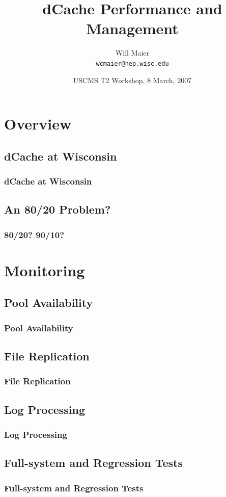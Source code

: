\documentclass{beamer}
\title{dCache Performance and Management}
\author[Will Maier]{Will Maier \\ \texttt{wcmaier@hep.wisc.edu}}
\institute[Wisconsin]{University of Wisconsin - High Energy Physics}
\date[8 March, 2007]{USCMS T2 Workshop, 8 March, 2007}
\begin{document}
\begin{frame}
    \titlepage
\end{frame}

\section{Overview}
\begin{frame}
    \tableofcontents
\end{frame}

\subsection{dCache at Wisconsin}
\begin{frame}
\frametitle{dCache at Wisconsin}
\end{frame}

\subsection[80/20?]{An 80/20 Problem?}
\begin{frame}
\frametitle{80/20? 90/10?}
\end{frame}

\section{Monitoring}
\subsection{Pool Availability}
\begin{frame}
\frametitle{Pool Availability}
\end{frame}

\subsection{File Replication}
\begin{frame}
\frametitle{File Replication}
\end{frame}

\subsection{Log Processing}
\begin{frame}
\frametitle{Log Processing}
\end{frame}

\subsection[Testing]{Full-system and Regression Tests}
\begin{frame}
\frametitle{Full-system and Regression Tests}
\end{frame}
\end{document}
